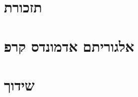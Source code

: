 \documentclass[]{article}
\def\lecnum{12}
\def\insert#1{}
\begin{document}

\section*{תזכורת}
\insert{remainder}

\section*{אלגוריתם אדמונדס קרפ}
\insert{edmonds}

\section*{שידוך}
\insert{matching}
\end{document}
